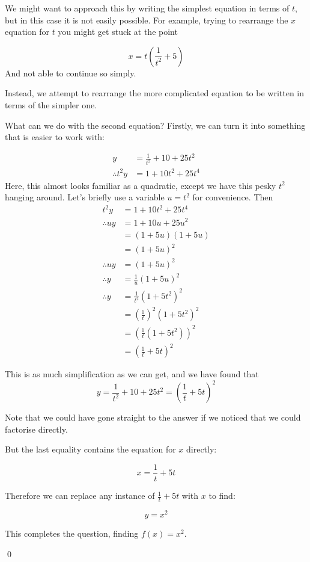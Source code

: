\begin{solution}
    We might want to approach this by writing the simplest equation in terms of $t$, but in this case it is not easily possible.
    For example, trying to rearrange the $x$ equation for $t$ you might get stuck at the point

    \[x = t(\frac{1}{t^2} +5)\]
    And not able to continue so simply.

    Instead, we attempt to rearrange the more complicated equation to be written in terms of the simpler one.

    What can we do with the second equation? Firstly, we can turn it into something that is easier to work with:

    \begin{align*}
        y &= \frac{1}{t^2} + 10 + 25t^2 \\
        \therefore t^2y &= 1 + 10t^2 + 25t^4
    \end{align*}
    Here, this almost looks familiar as a quadratic, except we have this pesky $t^2$ hanging around. Let's briefly use 
    a variable $u = t^2$ for convenience. Then 
    \begin{align*}
        t^2y &= 1 + 10t^2 + 25t^4 \\
        \therefore uy &= 1 + 10u + 25u^2 \tag{using $u = t^2$} \\
         &= (1 + 5u)(1 + 5u) \tag{factorising} \\
         &= (1+5u)^2\\
        \therefore uy &= (1+5u)^2 \tag{reminding ourselves} \\
        \therefore y &= \frac{1}{u}(1+5u)^2 \tag{rearranging}\\
        \therefore y &=  \frac{1}{t^2}(1+5t^2)^2 \tag{using $u = t^2$}\\
         &= (\frac{1}{t})^2(1+5t^2)^2 \tag{using $a^2/b^2 = (a/b)^2$}\\ 
         &= (\frac{1}{t}(1+5t^2))^2 \tag{using $a^2b^2 = (ab)^2$}\\ 
         &= (\frac{1}{t} + 5t)^2 \tag{expanding the bracket inside}
    \end{align*}

    This is as much simplification as we can get, and we have found that 
    \[ y = \frac{1}{t^2} + 10 + 25t^2  = (\frac{1}{t} + 5t)^2 \]

    Note that we could have gone straight to the answer if we noticed that we could factorise directly.

    But the last equality contains the equation for $x$ directly:

    \[x = \frac{1}{t} +5t\]

    Therefore we can replace any instance of $\frac{1}{t} +5t$ with $x$ to find:

    \[y = x^2\]

    This completes the question, finding $f(x) = x^2$.

    \qed
\end{solution}

